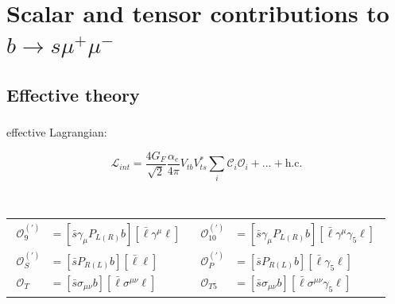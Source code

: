 \documentclass[english]{beamer}
\newcommand{\slide}[2][t]{\begin{frame}[#1] \frametitle{\insertsection} #2 \end{frame}}
\begin{document}

\section{Scalar and tensor contributions to $ b \to s \mu^+ \mu^- $}

\begin{frame}
\frametitle{\insertsectionhead}
\tableofcontents[currentsection]
\end{frame}

\subsection{Effective theory}

\slide{

    \frametitle{\insertsubsectionhead}

    effective Lagrangian: \
    \
    \newline \newline \

    $$ \mathcal{L}_{int} = \frac{4 G_F}{\sqrt{2}} \frac{\alpha_e}{4\pi} V_{tb}^{} V_{ts}^\ast \sum_i \mathcal{C}_i \mathcal{O}_i + ... + \text{h.c.} $$

    ~ \newline

    \begin{center}
      \begin{tabular}{cc}
          $ \begin{aligned}
                \mathcal{O}_{9} ^{(\prime)} & = \left[\bar{s} \gamma_\mu^{} P_{L(R)} b\right]\!\left[\bar{\ell} \gamma^\mu \ell\right] \\[10mm]
                \mathcal{O}_S^{(\prime)}    & = \left[\bar{s} P_{R(L)} b\right]\!\left[\bar{\ell} \ell\right] \\[5mm]
                \mathcal{O}_T               & = \left[\bar{s} \sigma_{\mu\nu}^{} b\right]\!\left[\bar{\ell} \sigma^{\mu\nu} \ell\right]
          \end{aligned} $ & $ \begin{aligned}
                \mathcal{O}_{10}^{(\prime)} & = \left[\bar{s} \gamma_\mu^{} P_{L(R)} b\right]\!\left[\bar{\ell} \gamma^\mu \gamma_5 \ell\right] \\[10mm]
                \mathcal{O}_P^{(\prime)}    & = \left[\bar{s} P_{R(L)} b\right]\!\left[\bar{\ell} \gamma_5 \ell\right] \\[5mm]
                \mathcal{O}_{T5}            & = \left[\bar{s} \sigma_{\mu\nu}^{} b\right]\!\left[\bar{\ell} \sigma^{\mu\nu} \gamma_5 \ell\right]
          \end{aligned} $
     \end{tabular}
    \end{center}

}
\end{document}
